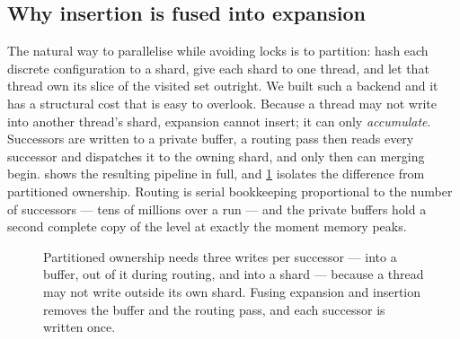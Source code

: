 \subsection{Why insertion is fused into expansion}

The natural way to parallelise while avoiding locks is to partition: hash each discrete
configuration to a shard, give each shard to one thread, and let that thread own its slice of
the visited set outright. We built such a backend and it has a structural cost that is easy to
overlook. Because a thread may not write into another thread's shard, expansion cannot insert;
it can only \emph{accumulate}. Successors are written to a private buffer, a routing pass then
reads every successor and dispatches it to the owning shard, and only then can merging begin.
 shows the resulting pipeline in full, and \cref{fig:dataflow} isolates the difference from partitioned ownership. Routing is serial bookkeeping proportional
to the number of successors --- tens of millions over a run --- and the private buffers hold a
second complete copy of the level at exactly the moment memory peaks.

\begin{figure}[t]
\centering
{}
\caption{Partitioned ownership needs three writes per successor --- into a buffer, out of it
during routing, and into a shard --- because a thread may not write outside its own shard.
Fusing expansion and insertion removes the buffer and the routing pass, and each successor is
written once.}
\label{fig:dataflow}
\end{figure}

